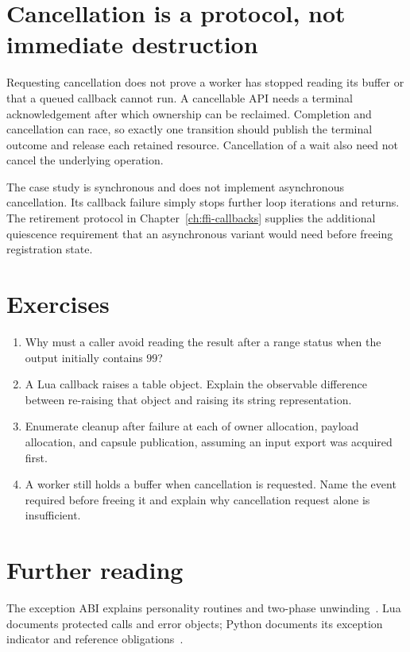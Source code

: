 \section{Cancellation is a protocol, not immediate destruction}
\label{sec:ch74-cancel}
Requesting cancellation does not prove a worker has stopped reading its buffer or that a queued callback cannot run.
A cancellable API needs a terminal acknowledgement after which ownership can be reclaimed.
Completion and cancellation can race, so exactly one transition should publish the terminal outcome and release each retained resource.
Cancellation of a wait also need not cancel the underlying operation.

The case study is synchronous and does not implement asynchronous cancellation.
Its callback failure simply stops further loop iterations and returns.
The retirement protocol in Chapter~\ref{ch:ffi-callbacks} supplies the additional quiescence requirement that an asynchronous variant would need before freeing registration state.

\section{Exercises}
\label{sec:ch74-exercises}
\begin{enumerate}
\item\label{ex:ch74-status} Why must a caller avoid reading the result after a range status when the output initially contains $99$?
\item\label{ex:ch74-identity} A Lua callback raises a table object.
Explain the observable difference between re-raising that object and raising its string representation.
\item\label{ex:ch74-cleanup} Enumerate cleanup after failure at each of owner allocation, payload allocation, and capsule publication, assuming an input export was acquired first.
\item\label{ex:ch74-cancel} A worker still holds a buffer when cancellation is requested.
Name the event required before freeing it and explain why cancellation request alone is insufficient.
\end{enumerate}

\section{Further reading}
\label{sec:ch74-reading}
The exception ABI explains personality routines and two-phase unwinding~\cite{itanium-2026-exceptions}.
Lua documents protected calls and error objects; Python documents its exception indicator and reference obligations~\cite{ierusalimschy-2026-lua,python-2026-capi}.
